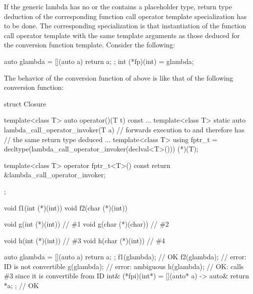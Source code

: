 \pnum
\begin{note}
If the generic lambda has no  or
the  contains a placeholder type, return type
deduction of the corresponding function call operator template specialization
has to be done. The corresponding specialization is that instantiation of the
function call operator template with the same template arguments as those
deduced for the conversion function template.  Consider the following:
\begin{codeblock}
auto glambda = [](auto a) { return a; };
int (*fp)(int) = glambda;
\end{codeblock}
The behavior of the conversion function of  above is like
that of the following conversion function:
\begin{codeblock}
struct Closure {
  template<class T> auto operator()(T t) const { ... }
  template<class T> static auto lambda_call_operator_invoker(T a) {
    // forwards execution to  and therefore has
    // the same return type deduced
    ...
  }
  template<class T> using fptr_t =
     decltype(lambda_call_operator_invoker(declval<T>())) (*)(T);

  template<class T> operator fptr_t<T>() const
    { return &lambda_call_operator_invoker; }
};
\end{codeblock}
\end{note}

\begin{example}
\begin{codeblock}
void f1(int (*)(int))   { }
void f2(char (*)(int))  { }

void g(int (*)(int))    { }  // \#1
void g(char (*)(char))  { }  // \#2

void h(int (*)(int))    { }  // \#3
void h(char (*)(int))   { }  // \#4

auto glambda = [](auto a) { return a; };
f1(glambda);  // OK
f2(glambda);  // error: ID is not convertible
g(glambda);   // error: ambiguous
h(glambda);   // OK: calls \#3 since it is convertible from ID
int& (*fpi)(int*) = [](auto* a) -> auto& { return *a; }; // OK
\end{codeblock}
\end{example}

